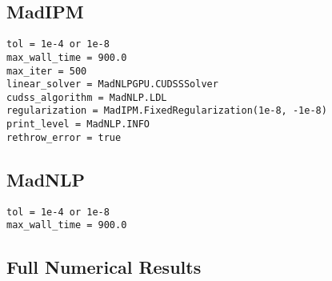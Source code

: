 \documentclass{article}
\begin{document}
\subsection{MadIPM} 
\begin{verbatim}
tol = 1e-4 or 1e-8
max_wall_time = 900.0
max_iter = 500
linear_solver = MadNLPGPU.CUDSSSolver
cudss_algorithm = MadNLP.LDL
regularization = MadIPM.FixedRegularization(1e-8, -1e-8)
print_level = MadNLP.INFO
rethrow_error = true
\end{verbatim}
\subsection{MadNLP}
\begin{verbatim}
tol = 1e-4 or 1e-8
max_wall_time = 900.0
\end{verbatim}
\subsection{Full Numerical Results}






\end{document}
